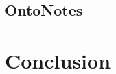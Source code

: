 \documentclass[a4paper, 12pt]{book}
\begin{document}
\section{OntoNotes}

\label{section:ontonotes}



\chapter{Conclusion}
\label{chapter:conclusion}



% 

% 
% 


%

\end{document}
